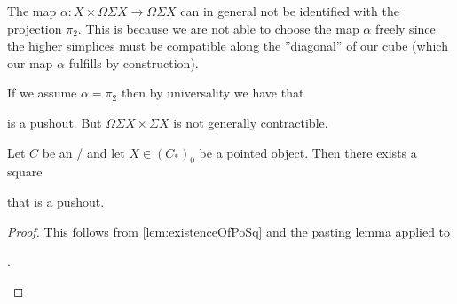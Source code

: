 \begin{remark}\label{rmk:mapNotProj}
    The map $\alpha\colon X\times\Omega\Sigma X\to\Omega\Sigma X$ can in general not be identified with the projection $\pi_2$.
    This is because we are not able to choose the map $\alpha$ freely since the higher simplices must be compatible along the ''diagonal'' of our cube (which our map $\alpha$ fulfills by construction).

    If we assume $\alpha=\pi_2$ then by universality we have that 
    \begin{center}
    \end{center}
    is a pushout.
    But $\Omega\Sigma X\times \Sigma X$ is not generally contractible. 
\end{remark}
\begin{corollary}\label{lem:poOfProductIsSuspension} %
    Let $C$ be an \inftytop/ and let $X\in \left(C_*\right)_0$ be a pointed object. 
    Then there exists a square
    \begin{center}
    \end{center}
    that is a pushout.
    \begin{proof}
        This follows from \cref{lem:existenceOfPoSq} and the pasting lemma applied to 
        \begin{center}
            \;.
        \end{center}
    \end{proof}
\end{corollary}
